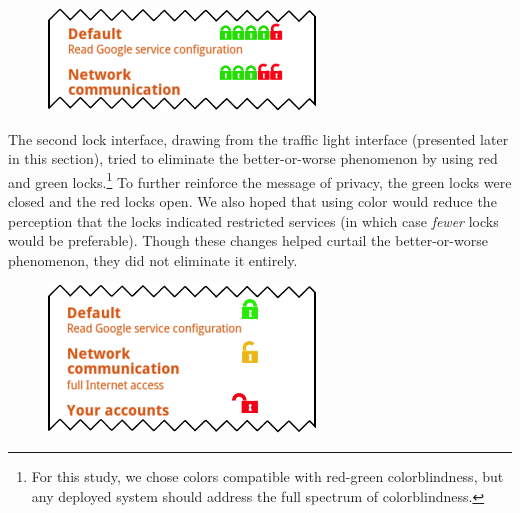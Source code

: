 \documentclass[11pt]{article}
\newcommand{\refsec}[1]{Section~\ref{#1}}
\begin{document}
\newpage

\begin{figure}
\begin{center}
\includegraphics[width=.9\linewidth]{candidate-img/locks/locksR2.png}
\end{center}
\end{figure}

The second lock interface, drawing from the traffic light interface
(presented later in this section), tried to eliminate the better-or-worse 
phenomenon by using red and green locks.\footnote{For this 
  study, we chose colors
  compatible with red-green colorblindness, but any deployed system
  should address the full spectrum of colorblindness.}
\label{ss-sec-locks-r2}
To further reinforce the message of privacy, the 
green locks were closed and the red locks open.
We also hoped that using color would reduce 
the perception that the locks indicated restricted services (in which 
case \emph{fewer} locks would be preferable).
Though these changes helped curtail the better-or-worse phenomenon, they did not 
eliminate it entirely. 


\begin{figure}
\begin{center}
\includegraphics[width=.9\linewidth]{candidate-img/locks/locksR3.png}
\end{center}
\end{figure}
\end{document}
